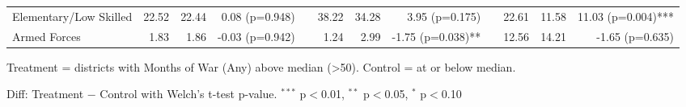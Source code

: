 \begin{table}[htbp]
\begin{tabular}{l rrr c rrr c rrr}
\quad Elementary/Low Skilled & 22.52 & 22.44 & 0.08 (p=0.948) &  & 38.22 & 34.28 & 3.95 (p=0.175) &  & 22.61 & 11.58 & 11.03 (p=0.004)*** \\
\quad Armed Forces & 1.83 & 1.86 & -0.03 (p=0.942) &  & 1.24 & 2.99 & -1.75 (p=0.038)** &  & 12.56 & 14.21 & -1.65 (p=0.635) \\
\bottomrule
\end{tabular}
\begin{tablenotes}
\small
\item Treatment = districts with Months of War (Any) above median (>50). Control = at or below median.
\item Diff: Treatment $-$ Control with Welch's t-test p-value. $^{{***}}$ p$<$0.01, $^{{**}}$ p$<$0.05, $^{{*}}$ p$<$0.10
\end{tablenotes}
\end{table}

\clearpage

